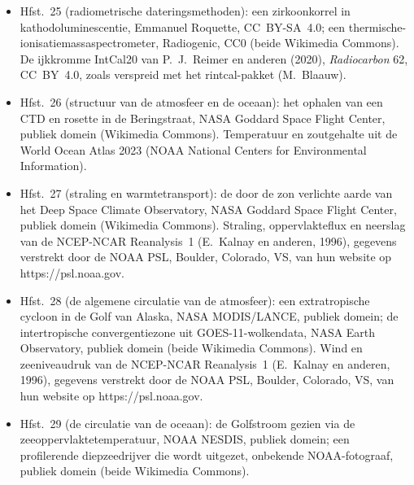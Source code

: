 \begin{itemize}
  \item Hfst.~25 (radiometrische dateringsmethoden): een zirkoonkorrel in kathodoluminescentie, Emmanuel Roquette, CC~BY-SA~4.0; een thermische-ionisatiemassaspectrometer, Radiogenic, CC0 (beide Wikimedia Commons). De ijkkromme IntCal20 van P.~J.~Reimer en anderen (2020), \emph{Radiocarbon} 62, CC~BY~4.0, zoals verspreid met het rintcal-pakket (M.~Blaauw).
  \item Hfst.~26 (structuur van de atmosfeer en de oceaan): het ophalen van een CTD en rosette in de Beringstraat, NASA Goddard Space Flight Center, publiek domein (Wikimedia Commons). Temperatuur en zoutgehalte uit de World Ocean Atlas 2023 (NOAA National Centers for Environmental Information).
  \item Hfst.~27 (straling en warmtetransport): de door de zon verlichte aarde van het Deep Space Climate Observatory, NASA Goddard Space Flight Center, publiek domein (Wikimedia Commons). Straling, oppervlakteflux en neerslag van de NCEP-NCAR Reanalysis~1 (E.~Kalnay en anderen, 1996), gegevens verstrekt door de NOAA PSL, Boulder, Colorado, VS, van hun website op https://psl.noaa.gov.
  \item Hfst.~28 (de algemene circulatie van de atmosfeer): een extratropische cycloon in de Golf van Alaska, NASA MODIS/LANCE, publiek domein; de intertropische convergentiezone uit GOES-11-wolkendata, NASA Earth Observatory, publiek domein (beide Wikimedia Commons). Wind en zeeniveaudruk van de NCEP-NCAR Reanalysis~1 (E.~Kalnay en anderen, 1996), gegevens verstrekt door de NOAA PSL, Boulder, Colorado, VS, van hun website op https://psl.noaa.gov.
  \item Hfst.~29 (de circulatie van de oceaan): de Golfstroom gezien via de zeeoppervlaktetemperatuur, NOAA NESDIS, publiek domein; een profilerende diepzeedrijver die wordt uitgezet, onbekende NOAA-fotograaf, publiek domein (beide Wikimedia Commons).
\end{itemize}
